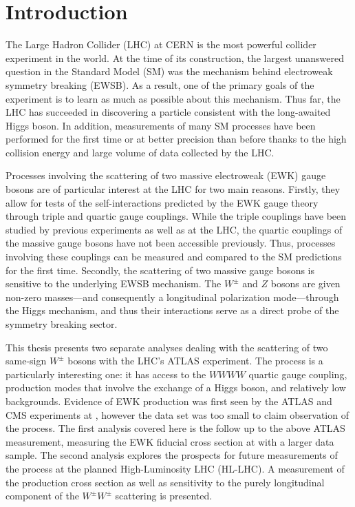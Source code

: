 \chapter[Introduction][Introduction]{Introduction}
The Large Hadron Collider (LHC) at CERN is the most powerful collider experiment in the world.
At the time of its construction, the largest unanswered question in the Standard Model (SM) was the mechanism behind electroweak symmetry breaking (EWSB).
As a result, one of the primary goals of the experiment is to learn as much as possible about this mechanism.
Thus far, the LHC has succeeded in discovering a particle consistent with the long-awaited Higgs boson. %
In addition, measurements of many SM processes have been performed for the first time or at better precision than before thanks to the high collision energy and large volume of data collected by the LHC.

Processes involving the scattering of two massive electroweak (EWK) gauge bosons are of particular interest at the LHC for two main reasons.
Firstly, they allow for tests of the self-interactions predicted by the EWK gauge theory through triple and quartic gauge couplings.
While the triple couplings have been studied by previous experiments as well as at the LHC, the quartic couplings of the massive gauge bosons have not been accessible previously.
Thus, processes involving these couplings can be measured and compared to the SM predictions for the first time.
Secondly, the scattering of two massive gauge bosons is sensitive to the underlying EWSB mechanism.
The $W^{\pm}$ and $Z$ bosons are given non-zero masses---and consequently a longitudinal polarization mode---through the Higgs mechanism, and thus their interactions serve as a direct probe of the symmetry breaking sector.

This thesis presents two separate analyses dealing with the scattering of two same-sign $W^{\pm}$ bosons with the LHC's ATLAS experiment.
The \ssww process is a particularly interesting one: it has access to the $WWWW$ quartic gauge coupling, production modes that involve the exchange of a Higgs boson, and relatively low backgrounds.
Evidence of EWK \ssww production was first seen by the ATLAS and CMS experiments at , however the data set was too small to claim observation of the process.
The first analysis covered here is the follow up to the above ATLAS measurement, measuring the EWK fiducial cross section at  with a larger data sample.
The second analysis explores the prospects for future measurements of the \ssww process at the planned High-Luminosity LHC (HL-LHC).
A measurement of the production cross section as well as sensitivity to the purely longitudinal component of the $W^{\pm}W^{\pm}$ scattering is presented.

